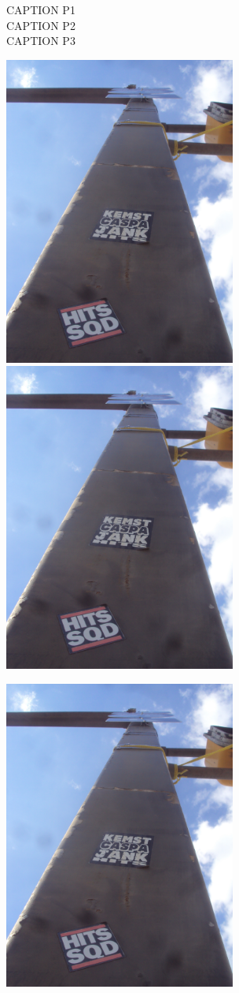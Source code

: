 \documentclass[10pt,letterpaper]{article}
\begin{document}
CAPTION P1\\
CAPTION P2\\
CAPTION P3\\
\pagebreak

\includegraphics[height=4in]{portrait.jpg}
\includegraphics[height=4in]{portrait.jpg}

\includegraphics[height=4in]{portrait.jpg}
\end{document}
